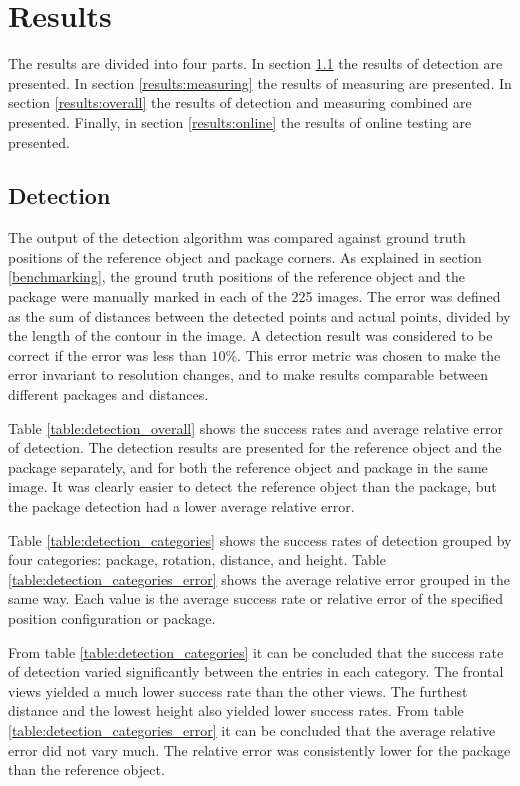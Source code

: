 \chapter{Results} \label{results}
The results are divided into four parts.
In section \ref{results:detection} the results of detection are presented.
In section \ref{results:measuring} the results of measuring are presented.
In section \ref{results:overall} the results of detection and measuring combined are presented.
Finally, in section \ref{results:online} the results of online testing are presented.

\section{Detection} \label{results:detection}
The output of the detection algorithm was compared against ground truth positions of the reference object and package corners. As explained in section \ref{benchmarking}, the ground truth positions of the reference object and the package were manually marked in each of the 225 images.
The error was defined as the sum of distances between the detected points and actual points, divided by the length of the contour in the image.
A detection result was considered to be correct if the error was less than $10\%$.
This error metric was chosen to make the error invariant to resolution changes, and to make results comparable between different packages and distances.

Table \ref{table:detection_overall} shows the success rates and average relative error of detection. The detection results are presented for the reference object and the package separately, and for both the reference object and package in the same image.
It was clearly easier to detect the reference object than the package, but the package detection had a lower average relative error.



Table \ref{table:detection_categories} shows the success rates of detection grouped by four categories: package, rotation, distance, and height. Table \ref{table:detection_categories_error} shows the average relative error grouped in the same way. Each value is the average success rate or relative error of the specified position configuration or package.





From table \ref{table:detection_categories} it can be concluded that the success rate of detection varied significantly between the entries in each category.
The frontal views yielded a much lower success rate than the other views.
The furthest distance and the lowest height also yielded lower success rates.
From table \ref{table:detection_categories_error} it can be concluded that the average relative error did not vary much.
The relative error was consistently lower for the package than the reference object.

